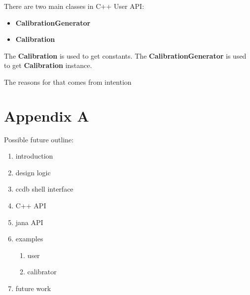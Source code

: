\documentclass{article}
\begin{document}
There are two main classes in C++ User API:

\begin{itemize}
  \item \textbf{CalibrationGenerator}
  \item \textbf{Calibration}
\end{itemize}
The \textbf{Calibration} is used to get constants.
The \textbf{CalibrationGenerator} is used to get \textbf{Calibration} instance.




The reasons for that comes from intention


\section{Appendix A}

Possible future outline:

\begin{enumerate}
\item introduction
\item design logic
\item ccdb shell interface
\item C++ API
\item jana API
\item examples
  \begin{enumerate}
  \item user
  \item calibrator
  \end{enumerate}
\item future work
\end{enumerate}
\end{document}
